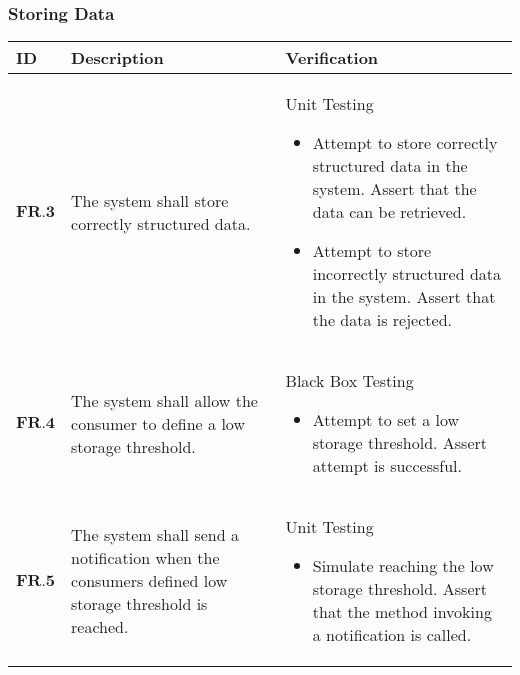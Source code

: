 \subsubsection{Storing Data}
\begin{longtable}[H]{| p{1.5cm} | p{4.5cm} | p{10.5cm}| }
        \hline
        \cellcolor{titleColor}\textbf{ID}    & \cellcolor{titleColor}\textbf{Description}                                                                                                                           & \cellcolor{titleColor}\textbf{Verification}                                                                                                                                                                                                                                                                    
        \\ \hline
        $\textbf{FR.3}$  & The system shall store correctly structured data.                                                                                              & Unit Testing\begin{itemize} \item Attempt to store correctly structured data in the system. Assert that the data can be retrieved.\item Attempt to store incorrectly structured data in the system. Assert that the data is rejected.\end{itemize}                                \\ \hline
        $\textbf{FR.4} $ & The system shall allow the consumer to define a low storage threshold.                                                                         & Black Box Testing\begin{itemize} \item Attempt to set a low storage threshold. Assert attempt is successful.\end{itemize}                                                                                                                                                           \\ \hline
        $\textbf{FR.5}$  & The system shall send a notification when the consumers defined low storage threshold is reached.                                              & Unit Testing\begin{itemize} \item Simulate reaching the low storage threshold. Assert that the method invoking a notification is called.\end{itemize}                                                                                                                               \\ \hline

\end{longtable}

